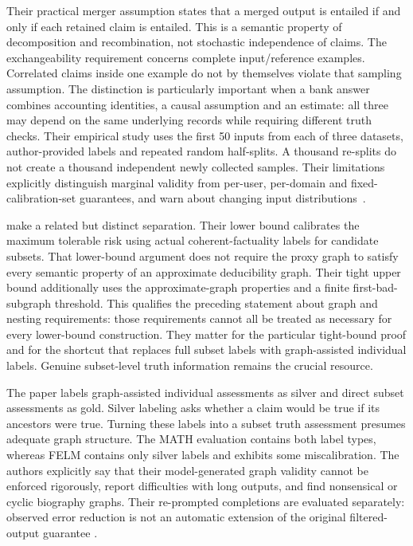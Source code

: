 Their practical merger assumption states that a merged output is entailed
if and only if each retained claim is entailed. This is a semantic property
of decomposition and recombination, not stochastic independence of claims.
The exchangeability requirement concerns complete input/reference examples.
Correlated claims inside one example do not by themselves violate that
sampling assumption. The distinction is particularly important when a bank
answer combines accounting identities, a causal assumption and an estimate:
all three may depend on the same underlying records while requiring different
truth checks. Their empirical study uses the first 50 inputs from each of
three datasets, author-provided labels and repeated random half-splits. A
thousand re-splits do not create a thousand independent newly collected
samples. Their limitations explicitly distinguish marginal validity from
per-user, per-domain and fixed-calibration-set guarantees, and warn about
changing input distributions~\citep{exec23_mohri_factuality}.

\citet{exec23_coherent_factuality} make a related but distinct separation.
Their lower bound calibrates the maximum tolerable risk using actual
coherent-factuality labels for candidate subsets. That lower-bound argument
does not require the proxy graph to satisfy every semantic property of an
approximate deducibility graph. Their tight upper bound additionally uses
the approximate-graph properties and a finite first-bad-subgraph threshold.
This qualifies the preceding statement about graph and nesting requirements:
those requirements cannot all be treated as necessary for every lower-bound
construction. They matter for the particular tight-bound proof and for the
shortcut that replaces full subset labels with graph-assisted individual
labels. Genuine subset-level truth information remains the crucial resource.

The paper labels graph-assisted individual assessments as silver and direct
subset assessments as gold. Silver labeling asks whether a claim would be
true if its ancestors were true. Turning these labels into a subset truth
assessment presumes adequate graph structure. The MATH evaluation contains
both label types, whereas FELM contains only silver labels and exhibits
some miscalibration. The authors explicitly say that their model-generated
graph validity cannot be enforced rigorously, report difficulties with long
outputs, and find nonsensical or cyclic biography graphs. Their re-prompted
completions are evaluated separately: observed error reduction is not an
automatic extension of the original filtered-output guarantee
\citep{exec23_coherent_factuality}.

